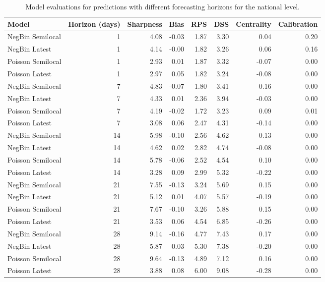 \begin{table}[ht]
\centering
\begin{tabular}{lrrrrrrr}
 Model & Horizon (days) & Sharpness & Bias & RPS & DSS & Centrality & Calibration \\ 
  \hline
NegBin Semilocal &   1 & 4.08 & -0.03 & 1.87 & 3.30 & 0.04 & 0.20 \\ 
  NegBin Latest &   1 & 4.14 & -0.00 & 1.82 & 3.26 & 0.06 & 0.16 \\ 
  Poisson Semilocal &   1 & 2.93 & 0.01 & 1.87 & 3.32 & -0.07 & 0.00 \\ 
  Poisson Latest &   1 & 2.97 & 0.05 & 1.82 & 3.24 & -0.08 & 0.00 \\ 
   \hline
NegBin Semilocal &   7 & 4.83 & -0.07 & 1.80 & 3.41 & 0.16 & 0.00 \\ 
  NegBin Latest &   7 & 4.33 & 0.01 & 2.36 & 3.94 & -0.03 & 0.00 \\ 
  Poisson Semilocal &   7 & 4.19 & -0.02 & 1.72 & 3.23 & 0.09 & 0.01 \\ 
  Poisson Latest &   7 & 3.08 & 0.06 & 2.47 & 4.31 & -0.14 & 0.00 \\ 
   \hline
NegBin Semilocal &  14 & 5.98 & -0.10 & 2.56 & 4.62 & 0.13 & 0.00 \\ 
  NegBin Latest &  14 & 4.62 & 0.02 & 2.82 & 4.74 & -0.08 & 0.00 \\ 
  Poisson Semilocal &  14 & 5.78 & -0.06 & 2.52 & 4.54 & 0.10 & 0.00 \\ 
  Poisson Latest &  14 & 3.28 & 0.09 & 2.99 & 5.32 & -0.22 & 0.00 \\ 
   \hline
NegBin Semilocal &  21 & 7.55 & -0.13 & 3.24 & 5.69 & 0.15 & 0.00 \\ 
  NegBin Latest &  21 & 5.12 & 0.01 & 4.07 & 5.57 & -0.19 & 0.00 \\ 
  Poisson Semilocal &  21 & 7.67 & -0.10 & 3.26 & 5.88 & 0.15 & 0.00 \\ 
  Poisson Latest &  21 & 3.53 & 0.06 & 4.54 & 6.85 & -0.26 & 0.00 \\ 
   \hline
NegBin Semilocal &  28 & 9.14 & -0.16 & 4.77 & 7.43 & 0.17 & 0.00 \\ 
  NegBin Latest &  28 & 5.87 & 0.03 & 5.30 & 7.38 & -0.20 & 0.00 \\ 
  Poisson Semilocal &  28 & 9.64 & -0.13 & 4.89 & 7.12 & 0.16 & 0.00 \\ 
  Poisson Latest &  28 & 3.88 & 0.08 & 6.00 & 9.08 & -0.28 & 0.00 \\ 
   \hline
\end{tabular}
\caption{Model evaluations for predictions with different forecasting horizons for the national level.} 
\label{tab:nat_evo}
\end{table}
